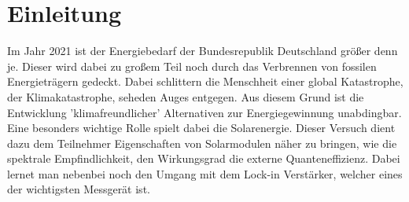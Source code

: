 

\chapter{Einleitung}
\label{chap:einleitung}

Im Jahr 2021 ist der Energiebedarf der Bundesrepublik Deutschland größer denn je. Dieser wird dabei zu großem Teil noch durch das Verbrennen von 
fossilen Energieträgern gedeckt. Dabei schlittern die Menschheit einer global Katastrophe, der 
Klimakatastrophe, seheden Auges entgegen. Aus diesem Grund ist die Entwicklung 'klimafreundlicher' Alternativen zur Energiegewinnung unabdingbar.
Eine besonders wichtige Rolle spielt dabei die Solarenergie. Dieser Versuch dient dazu dem Teilnehmer Eigenschaften von Solarmodulen näher zu  bringen, 
wie die spektrale Empfindlichkeit, den Wirkungsgrad die externe Quanteneffizienz. Dabei lernet man nebenbei noch den Umgang mit dem Lock-in Verstärker, 
welcher eines der wichtigsten Messgerät ist.